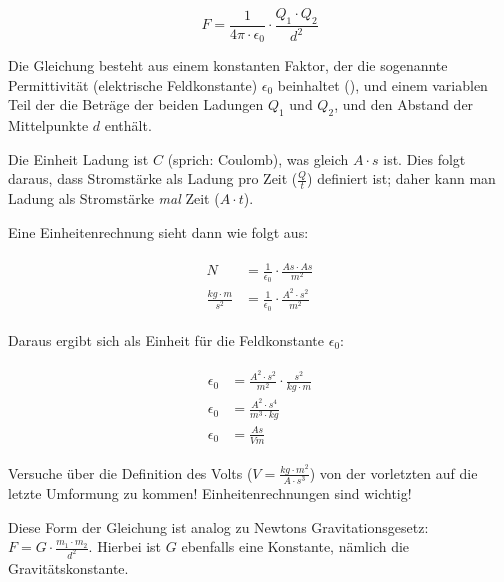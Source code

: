 \begin{equation} \label{eq:coulomb_gesetz}
	F = \frac{1}{4\pi \cdot \epsilon_0} \cdot \frac{Q_1 \cdot Q_2}{d^{2}}
\end{equation}

Die Gleichung besteht aus einem konstanten Faktor, der die sogenannte \glqq Permittivität\grqq{} (\glqq elektrische Feldkonstante\grqq ) $\epsilon_0$ beinhaltet (), und einem variablen Teil der die Beträge der beiden Ladungen $Q_1$ und $Q_2$, und den Abstand der Mittelpunkte $d$ enthält.

Die Einheit Ladung ist $C$ (sprich: \glqq Coulomb\grqq ), was gleich $A \cdot s$ ist. Dies folgt daraus, dass Stromstärke als Ladung pro Zeit ($\frac{Q}{t}$) definiert ist; daher kann man Ladung als Stromstärke \emph{mal} Zeit ($A \cdot t$).

Eine Einheitenrechnung sieht dann wie folgt aus:

\begin{align}\label{eq:coulomb_gesetz_einheiten}
\begin{split}
	N 							&= \frac{1}{\epsilon_0} \cdot \frac{As \cdot As}{m^{2}} \\
	\frac{kg \cdot m}{s^{2}} 	&= \frac{1}{\epsilon_0} \cdot \frac{A^{2} \cdot s^{2}}{m^{2}}
\end{split}
\end{align}

\noindent Daraus ergibt sich als Einheit für die Feldkonstante $\epsilon_0$:

\begin{align}\label{eq:feldkonstante_einheiten}
\begin{split}
	\epsilon_0 &= \frac{A^{2} \cdot s^{2}}{m^{2}} \cdot \frac{s^{2}}{kg \cdot m} \\
	\epsilon_0 &= \frac{A^{2} \cdot s^{4}}{m^{3} \cdot kg} \\
	\epsilon_0 &= \frac{As}{Vm}
\end{split}
\end{align}

\begin{Aufgabe}
Versuche über die Definition des Volts ($V=\frac{kg \cdot m^2}{A \cdot s^3}$) von der vorletzten auf die letzte Umformung zu kommen! Einheitenrechnungen sind wichtig!
\end{Aufgabe}

\begin{NiceToKnow}
Diese Form der Gleichung ist analog zu Newtons Gravitationsgesetz: $F = G \cdot \frac{m_1 \cdot m_2}{d^2}$. Hierbei ist $G$ ebenfalls eine Konstante, nämlich die Gravitätskonstante.
\end{NiceToKnow}


